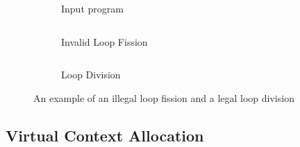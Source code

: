 \begin{figure}
\centering
\begin{subfigure}[b]{0.28\textwidth}
\inputminted{python}{code/loopexp2.py}
\caption{Input program}
\end{subfigure}
\hfill
\begin{subfigure}[b]{0.32\textwidth}
\inputminted{python}{code/loopexp2fission.py}
\caption{Invalid Loop Fission}
\end{subfigure}
\hfill
\begin{subfigure}[b]{0.31\textwidth}
\inputminted{python}{code/loopexp2division.py}
\caption{Loop Division}
\end{subfigure}
\caption[An example of an illegal loop fission and a valid loop division]{
An example of an illegal loop fission and a legal loop division
}
\label{fig:loopexp2}
\end{figure}

\subsection{Virtual Context Allocation} 

